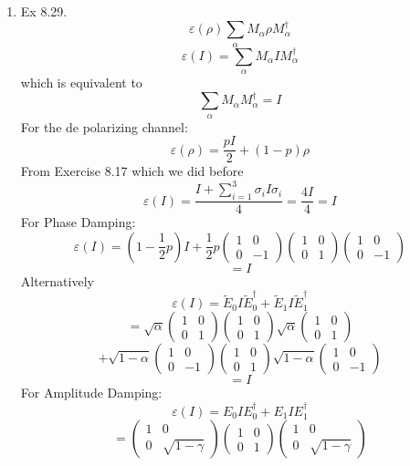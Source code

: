 \documentclass[12pt]{article}
\begin{document}
\begin{enumerate}
    \item Ex 8.29. 
    $$ \varepsilon (\rho) \sum_{\alpha} M_{\alpha} \rho M_{\alpha}^{\dagger} $$
    $$ \varepsilon(I) = \sum_{\alpha} M_{\alpha} I M_{\alpha}^{\dagger} $$
    which is equivalent to 
    $$ \sum_{\alpha} M_{\alpha} M_{\alpha}^{\dagger} = I $$
    For the de polarizing channel: 
    $$ \varepsilon (\rho) = \frac{p I}{2} + (1-p)\rho $$
    From Exercise 8.17 which we did before 
    $$ \varepsilon (I) = \frac{I + \sum_{i=1}^3 \sigma_i I \sigma_i}{4} = \frac{4 I}{4} = I $$
    For Phase Damping: 
    $$ \varepsilon (I) = (1- \frac{1}{2} p) I + \frac{1}{2} p  \left(\begin{array}{cc} 1  & 0 \\  0& -1 \end{array}\right) \left(\begin{array}{cc} 1  & 0 \\  0& 1 \end{array}\right) \left(\begin{array}{cc} 1  & 0 \\  0& -1 \end{array}\right) $$
    $$ = I$$
    Alternatively 
    $$ \varepsilon (I) = \tilde{E}_0 I \tilde{E}_0^{\dagger} + \tilde{E}_1 I \tilde{E}_1^{\dagger} $$
    $$ = \sqrt{\alpha} \left(\begin{array}{cc} 1  & 0 \\  0& 1 \end{array}\right) \left(\begin{array}{cc} 1  & 0 \\  0& 1 \end{array}\right)\sqrt{\alpha} \left(\begin{array}{cc} 1  & 0 \\  0& 1 \end{array}\right) $$
    $$ + \sqrt{1-\alpha} \left(\begin{array}{cc} 1  & 0 \\  0& -1 \end{array}\right) \left(\begin{array}{cc} 1  & 0 \\  0& 1 \end{array}\right)\sqrt{1-\alpha} \left(\begin{array}{cc} 1  & 0 \\  0& -1 \end{array}\right) $$
    $$ = I $$
    For Amplitude Damping: 
    $$ \varepsilon (I) = E_0 I E_0^{\dagger} + E_1 I E_1^{\dagger} $$
    $$ = \left(\begin{array}{cc} 1  & 0 \\  0& \sqrt{1-\gamma} \end{array}\right) \left(\begin{array}{cc} 1  & 0 \\  0& 1 \end{array}\right) \left(\begin{array}{cc} 1  & 0 \\  0& \sqrt{1-\gamma} \end{array}\right) $$

\end{enumerate}
\end{document}
